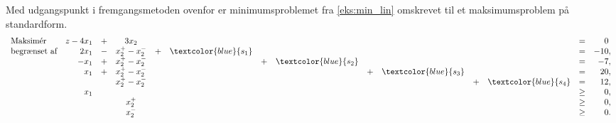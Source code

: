 %
\begin{eks}
Med udgangspunkt i fremgangsmetoden ovenfor er minimumsproblemet fra \ref{eks:min_lin} omskrevet til et maksimumsproblem på standardform.
%
\begin{align*}
\begin{array}{lrcccrcrcrcrcrcr}
\text{Maksimér}		&z-4x_1 &+& 3x_2& & & & & & & & & = & 0\phantom{,}\\
\text{begrænset af}	&2x_1	&-	&x_2^+-x_2^-		&+	&\textcolor{blue}{s_1}&	&	&	&	&	&	&= 		&-10,\\
					&-x_1	&+	&x_2^+-x_2^-		&	&	&+	&\textcolor{blue}{s_2} &	&	&	&	&=		& -7,\\
					&x_1	&+	&x_2^+-x_2^-		&	&	&	&	&+	&\textcolor{blue}{s_3}&	&	&=		& 20,\\
					& 		&	&x_2^+-x_2^-&	&	&	&	&	&	&+	&\textcolor{blue}{s_4} &=		& 12,\\
					&x_1	&	&			&	&	&	&	&	&	&	&	&\geq	& 0,\\
					&		&	&x_2^+	&	&	&	&	&	&	&	&	&\geq	& 0,\\
					&		&	&x_2^-	&	&	&	&	&	&	&	&	&\geq	& 0.\\
\end{array}
\end{align*}
\end{eks}